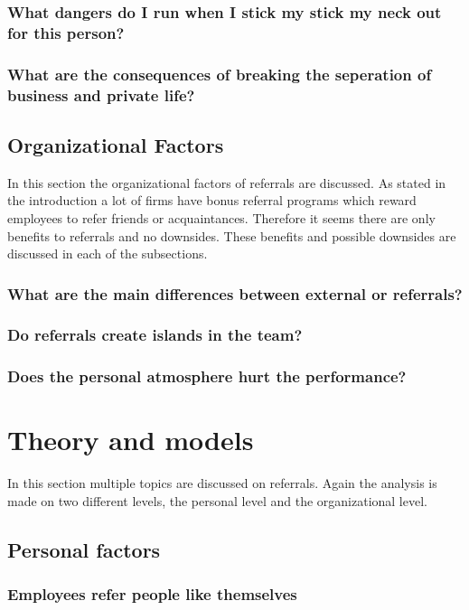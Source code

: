 \documentclass[a4paper, 11pt]{article} %
\begin{document}
\subsubsection*{What dangers do I run when I stick my stick my neck out for this person?}
\subsubsection*{What are the consequences of breaking the seperation of business and private life?}

\subsection*{Organizational Factors}

In this section the organizational factors of referrals are discussed. As stated in the introduction a lot of firms have bonus referral programs which reward employees to refer friends or acquaintances. Therefore it seems there are only benefits to referrals and no downsides. These benefits and possible downsides are discussed in each of the subsections.

\subsubsection*{What are the main differences between external or referrals?}
\subsubsection*{Do referrals create islands in the team?}
\subsubsection*{Does the personal atmosphere hurt the performance?}

\section*{Theory and models}
In this section multiple topics are discussed on referrals. Again the analysis is made on two different levels, the personal level and the organizational level. 

\subsection*{Personal factors}

\subsubsection*{Employees refer people like themselves}
\end{document}
